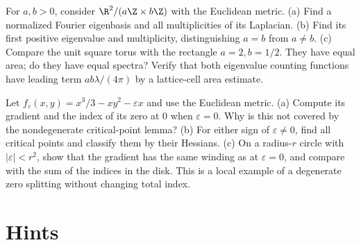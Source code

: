 \begin{exercise}[$\star\star$]\label{ex:v9-ch04-rectangular-spectrum}
For $a,b>0$, consider $\R^2/(a\Z\times b\Z)$ with the Euclidean metric.
(a) Find a normalized Fourier eigenbasis and all multiplicities of its Laplacian.
(b) Find its first positive eigenvalue and multiplicity, distinguishing $a=b$ from $a\ne b$.
(c) Compare the unit square torus with the rectangle $a=2,b=1/2$. They have equal area; do they have equal spectra? Verify that both eigenvalue counting functions have leading term $ab\lambda/(4\pi)$ by a lattice-cell area estimate.
\end{exercise}

\begin{exercise}[$\star\star$]\label{ex:v9-ch04-split-index}
Let $f_\varepsilon(x,y)=x^3/3-xy^2-\varepsilon x$ and use the Euclidean metric.
(a) Compute its gradient and the index of its zero at $0$ when $\varepsilon=0$. Why is this not covered by the nondegenerate critical-point lemma?
(b) For either sign of $\varepsilon\ne0$, find all critical points and classify them by their Hessians.
(c) On a radius-$r$ circle with $|\varepsilon|<r^2$, show that the gradient has the same winding as at $\varepsilon=0$, and compare with the sum of the indices in the disk. This is a local example of a degenerate zero splitting without changing total index.
\end{exercise}

\section{Hints}


